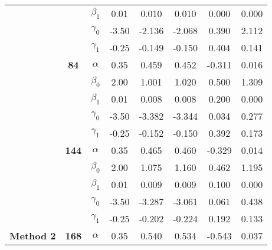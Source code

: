 \begin{table}[h]
\begin{tabular}[t]{>{}c>{}ccccccc}
 &  & $\beta_1$ & 0.01 & 0.010 & 0.010 & 0.000 & 0.000\\

 &  & $\gamma_0$ & -3.50 & -2.136 & -2.068 & 0.390 & 2.112\\

 &  & $\gamma_1$ & -0.25 & -0.149 & -0.150 & 0.404 & 0.141\\

 & \multirow{-5}{*}{\centering\arraybackslash \textbf{84}} & $\alpha$ & 0.35 & 0.459 & 0.452 & -0.311 & 0.016\\

 &  & $\beta_0$ & 2.00 & 1.001 & 1.020 & 0.500 & 1.309\\

 &  & $\beta_1$ & 0.01 & 0.008 & 0.008 & 0.200 & 0.000\\

 &  & $\gamma_0$ & -3.50 & -3.382 & -3.344 & 0.034 & 0.277\\

 &  & $\gamma_1$ & -0.25 & -0.152 & -0.150 & 0.392 & 0.173\\

 & \multirow{-5}{*}{\centering\arraybackslash \textbf{144}} & $\alpha$ & 0.35 & 0.465 & 0.460 & -0.329 & 0.014\\

 &  & $\beta_0$ & 2.00 & 1.075 & 1.160 & 0.462 & 1.195\\

 &  & $\beta_1$ & 0.01 & 0.009 & 0.009 & 0.100 & 0.000\\

 &  & $\gamma_0$ & -3.50 & -3.287 & -3.061 & 0.061 & 0.438\\

 &  & $\gamma_1$ & -0.25 & -0.202 & -0.224 & 0.192 & 0.133\\

\multirow{-15}{*}{\centering\arraybackslash \textbf{Method 2}} & \multirow{-5}{*}{\centering\arraybackslash \textbf{168}} & $\alpha$ & 0.35 & 0.540 & 0.534 & -0.543 & 0.037\\
\bottomrule
\end{tabular}
\end{table}
